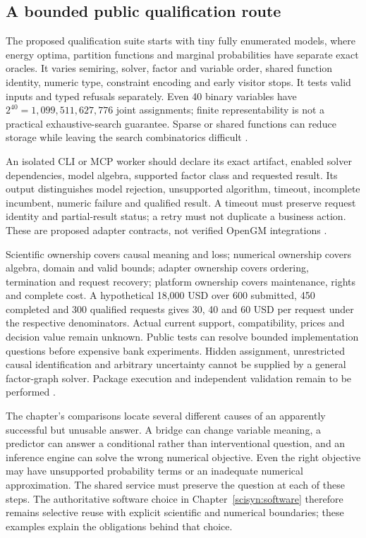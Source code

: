 \subsection{A bounded public qualification route}
The proposed qualification suite starts with tiny fully enumerated models,
where energy optima, partition functions and marginal probabilities have
separate exact oracles. It varies semiring, solver, factor and variable
order, shared function identity, numeric type, constraint encoding and
early visitor stops. It tests valid inputs and typed refusals separately.
Even 40 binary variables have $2^{40}=1{,}099{,}511{,}627{,}776$ joint
assignments; finite representability is not a practical exhaustive-search
guarantee. Sparse or shared functions can reduce storage while leaving
the search combinatorics difficult \citep{exec24_opengm_choice}.

An isolated CLI or MCP worker should declare its exact artifact, enabled
solver dependencies, model algebra, supported factor class and requested
result. Its output distinguishes model rejection, unsupported algorithm,
timeout, incomplete incumbent, numeric failure and qualified result. A
timeout must preserve request identity and partial-result status; a retry
must not duplicate a business action. These are proposed adapter contracts,
not verified OpenGM integrations \citep{exec24_opengm_choice}.

Scientific ownership covers causal meaning and loss; numerical ownership
covers algebra, domain and valid bounds; adapter ownership covers ordering,
termination and request recovery; platform ownership covers maintenance,
rights and complete cost. A hypothetical 18,000 USD over 600 submitted,
450 completed and 300 qualified requests gives 30, 40 and 60 USD per request
under the respective denominators. Actual current support, compatibility,
prices and decision value remain unknown. Public tests can resolve bounded
implementation questions before expensive bank experiments. Hidden
assignment, unrestricted causal identification and arbitrary uncertainty
cannot be supplied by a general factor-graph solver. Package execution and
independent validation remain to be performed
\citep{exec24_opengm_choice}.

The chapter's comparisons locate several different causes of an apparently
successful but unusable answer. A bridge can change variable meaning, a
predictor can answer a conditional rather than interventional question, and
an inference engine can solve the wrong numerical objective. Even the right
objective may have unsupported probability terms or an inadequate numerical
approximation. The shared service must preserve the question at each of
these steps. The authoritative software choice in
Chapter~\ref{scisyn:software} therefore remains selective reuse with explicit
scientific and numerical boundaries; these examples explain the obligations
behind that choice.

